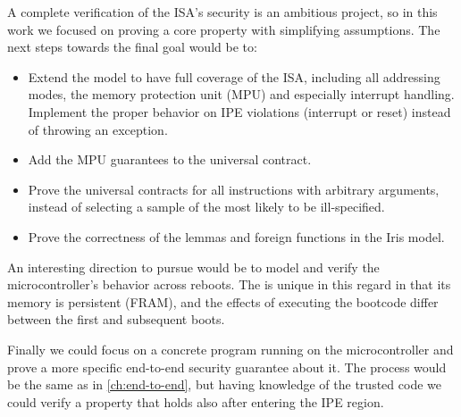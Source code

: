 A complete verification of the \msp ISA's security is an ambitious project, so in this work we focused on proving a core property with simplifying assumptions. The next steps towards the final goal would be to:
\begin{itemize}
\item Extend the model to have full coverage of the \msp ISA, including all addressing modes, the memory protection unit (MPU) and especially interrupt handling. Implement the proper behavior on IPE violations (interrupt or reset) instead of throwing an exception.
\item Add the MPU guarantees to the universal contract.
\item Prove the universal contracts for all instructions with arbitrary arguments, instead of selecting a sample of the most likely to be ill-specified.
\item Prove the correctness of the lemmas and foreign functions in the Iris model.
\end{itemize}

An interesting direction to pursue would be to model and verify the microcontroller's behavior across reboots. The \msp is unique in this regard in that its memory is persistent (FRAM), and the effects of executing the bootcode differ between the first and subsequent boots.

Finally we could focus on a concrete program running on the microcontroller and prove a more specific end-to-end security guarantee about it. The process would be the same as in \cref{ch:end-to-end}, but having knowledge of the trusted code we could verify a property that holds also after entering the IPE region.





